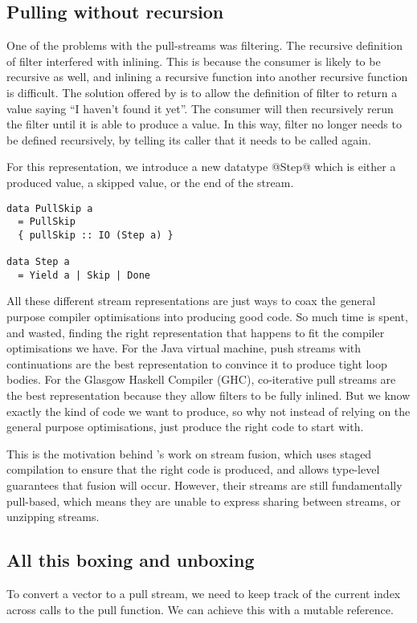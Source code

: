 \subsection{Pulling without recursion}
One of the problems with the pull-streams was filtering.
The recursive definition of filter interfered with inlining.
This is because the consumer is likely to be recursive as well, and inlining a recursive function into another recursive function is difficult.
The solution offered by \citet{coutts2007stream} is to allow the definition of filter to return a value saying ``I haven't found it yet''.
The consumer will then recursively rerun the filter until it is able to produce a value.
In this way, filter no longer needs to be defined recursively, by telling its caller that it needs to be called again.

For this representation, we introduce a new datatype @Step@ which is either a produced value, a skipped value, or the end of the stream.

\begin{lstlisting}
data PullSkip a
  = PullSkip
  { pullSkip :: IO (Step a) }

data Step a
  = Yield a | Skip | Done
\end{lstlisting}

All these different stream representations are just ways to coax the general purpose compiler optimisations into producing good code.
So much time is spent, and wasted, finding the right representation that happens to fit the compiler optimisations we have.
For the Java virtual machine, push streams with continuations are the best representation to convince it to produce tight loop bodies.
For the Glasgow Haskell Compiler (GHC), co-iterative pull streams are the best representation because they allow filters to be fully inlined.
But we know exactly the kind of code we want to produce, so why not instead of relying on the general purpose optimisations, just produce the right code to start with.

This is the motivation behind \citet{kiselyov2016stream}'s work on stream fusion, which uses staged compilation to ensure that the right code is produced, and allows type-level guarantees that fusion will occur.
However, their streams are still fundamentally pull-based, which means they are unable to express sharing between streams, or unzipping streams.

\subsection{All this boxing and unboxing}
To convert a vector to a pull stream, we need to keep track of the current index across calls to the pull function.
We can achieve this with a mutable reference.

